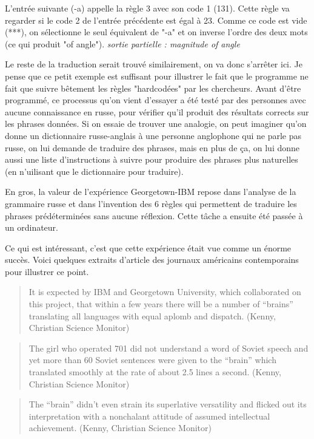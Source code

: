 \documentclass[11pt, a4paper]{report}
\begin{document}
L'entrée suivante (-a) appelle la règle 3 avec son code 1 (131). Cette règle va regarder si le 
code 2 de l'entrée précédente est égal à 23. Comme ce code est vide (***), on sélectionne le seul 
équivalent de "-a" et on inverse l'ordre des deux mots (ce qui produit "of angle"). \newline
\textit{sortie partielle : magnitude of angle}

Le reste de la traduction serait trouvé similairement, on va donc s'arrêter ici. Je pense que ce 
petit exemple est suffisant pour illustrer le fait que le programme ne fait que suivre bêtement les 
règles "hardcodées" par les chercheurs. Avant d'être programmé, ce processus qu'on vient d'essayer 
a été testé par des personnes avec aucune connaissance en russe, pour vérifier qu'il produit des 
résultats corrects sur les phrases données. Si on essaie de trouver une analogie, on peut imaginer
qu'on donne un dictionnaire russe-anglais à une personne anglophone qui ne parle pas russe, on lui demande 
de traduire des phrases, mais en plus de ça, on lui donne aussi une liste d'instructions à suivre 
pour produire des phrases plus naturelles (en n'uilisant que le dictionnaire pour traduire). 

En gros, la valeur de l'expérience Georgetown-IBM repose dans l'analyse de la grammaire russe et dans 
l'invention des 6 règles qui permettent de traduire les phrases prédéterminées sans aucune réflexion. 
Cette tâche a ensuite été passée à un ordinateur. 

Ce qui est intéressant, c'est que cette expérience était vue comme un énorme succès. Voici quelques 
extraits d'article des journaux américains contemporains pour illustrer ce point.
\begin{quote} 
It is expected by IBM and Georgetown University, which collaborated on this project,
that within a few years there will be a number of “brains” translating all languages
with equal aplomb and dispatch. (Kenny, Christian Science Monitor)
\end{quote}

\begin{quote}
The girl who operated 701 did not understand a word of Soviet speech and yet more
than 60 Soviet sentences were given to the “brain” which translated smoothly at the
rate of about 2.5 lines a second. (Kenny, Christian Science Monitor)
\end{quote}

\begin{quote}
The “brain” didn’t even strain its superlative versatility and flicked out its
interpretation with a nonchalant attitude of assumed intellectual achievement. (Kenny,
Christian Science Monitor)
\end{quote}
\end{document}
